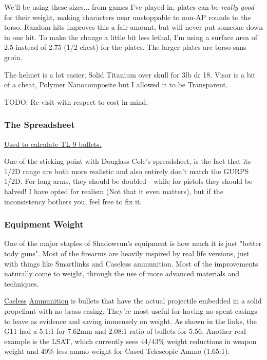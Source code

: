 \begin{multicols*}{2}
	We'll be using these sizes... from games I've played in, plates can be \textit{really good} for their weight, making characters near unstoppable to non-AP rounds to the torso. Random hits improves this a fair amount, but will never put someone down in one hit. To make the change a little bit less lethal, I'm using a surface area of 2.5 instead of 2.75 (1/2 chest) for the plates. The larger plates are torso sans groin.
	
	The helmet is a lot easier; Solid Titanium over skull for 3lb dr 18. Visor is a bit of a cheat, Polymer Nanocomposite but I allowed it to be Transparent.
	
	TODO: Re-visit with respect to cost in mind.
	
	\subsubsection{The Spreadsheet}
	
	\textcolor{Blue}{\href{http://forums.sjgames.com/showpost.php?p=2124462&postcount=37}{Used to calculate TL 9 bullets.}}
	
	One of the sticking point with Douglass Cole's spreadsheet, is the fact that its 1/2D range are both more realistic and also entirely don't match the GURPS 1/2D. For long arms, they should be doubled - while for pistols they should be halved! I have opted for realism (Not that it even matters), but if the inconsistency bothers you, feel free to fix it.
	
	\subsubsection{Equipment Weight}
	
	One of the major staples of Shadowrun's equipment is how much it is just "better tody guns". Most of the firearms are heavily inspired by real life versions, just with things like Smartlinks and Caseless ammunition. Most of the improvements naturally come to weight, through the use of more advanced materials and techniques.
	
	\textcolor{NavyBlue}{\href{http://futurewarstories.blogspot.com/2012/10/fws-armory-caseless-ammunition.html}{Casless}} \textcolor{Blue}{\href{http://www.projectrho.com/public_html/rocket/sidearmslug.php}{Ammunition}} is bullets that have the actual projectile embedded in a solid propellant with no brass casing. They're most useful for having no spent casings to leave as evidence and saving immensely on weight. As shown in the links, the G11 had a 5.1:1 for 7.62mm and 2.08:1 ratio of bullets for 5.56. Another real example is the LSAT, which currently sees 44/43\% weight reductions in weapon weight and 40\% less ammo weight for Cased Telescopic Ammo (1.65:1).
	

\end{multicols*}
